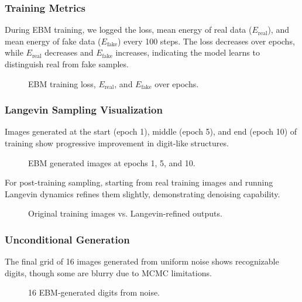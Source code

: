 \documentclass[a4paper,12pt]{article}
\begin{document}
\subsubsection{Training Metrics}
During EBM training, we logged the loss, mean energy of real data ($E_{\text{real}}$), and mean energy of fake data ($E_{\text{fake}}$) every 100 steps. The loss decreases over epochs, while $E_{\text{real}}$ decreases and $E_{\text{fake}}$ increases, indicating the model learns to distinguish real from fake samples.

\begin{figure}[H]
\centering
{}
\caption{EBM training loss, $E_{\text{real}}$, and $E_{\text{fake}}$ over epochs.}
\label{fig:ebm_loss}
\end{figure}

\subsubsection{Langevin Sampling Visualization}
Images generated at the start (epoch 1), middle (epoch 5), and end (epoch 10) of training show progressive improvement in digit-like structures.

\begin{figure}[H]
\centering
{}
\caption{EBM generated images at epochs 1, 5, and 10.}
\label{fig:ebm_progress}
\end{figure}

For post-training sampling, starting from real training images and running Langevin dynamics refines them slightly, demonstrating denoising capability.

\begin{figure}[H]
\centering
{}
\caption{Original training images vs. Langevin-refined outputs.}
\label{fig:ebm_post}
\end{figure}

\subsubsection{Unconditional Generation}
The final grid of 16 images generated from uniform noise shows recognizable digits, though some are blurry due to MCMC limitations.

\begin{figure}[H]
\centering
{}
\caption{16 EBM-generated digits from noise.}
\label{fig:ebm_uncond}
\end{figure}
\end{document}
